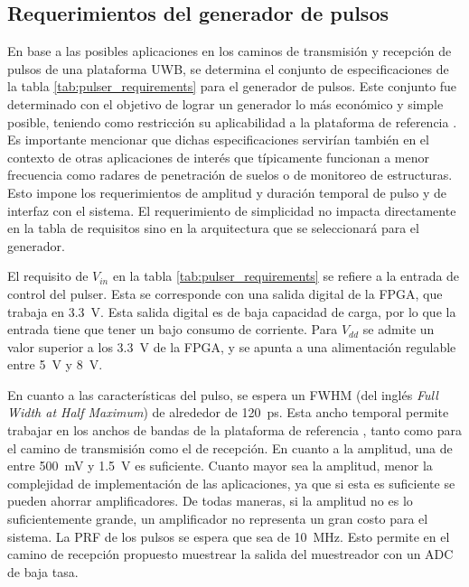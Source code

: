 \subsection{Requerimientos del generador de pulsos}

En base a las posibles aplicaciones en los caminos de transmisión y recepción de
pulsos de una plataforma UWB, se determina el conjunto de especificaciones de la
tabla \ref{tab:pulser_requirements} para el generador de pulsos. Este conjunto
fue determinado con el objetivo de lograr un generador lo más económico y simple
posible, teniendo como restricción su aplicabilidad a la plataforma de
referencia \cite{Altieri2021}. Es importante mencionar que dichas
especificaciones servirían también en el contexto de otras aplicaciones de
interés que típicamente funcionan a menor frecuencia como radares de penetración
de suelos o de monitoreo de estructuras. Esto impone los requerimientos de
amplitud y duración temporal de pulso y de interfaz con el sistema. El
requerimiento de simplicidad no impacta directamente en la tabla de requisitos
sino en la arquitectura que se seleccionará para el generador.

El requisito de $V_{in}$ en la tabla \ref{tab:pulser_requirements} se refiere a
la entrada de control del pulser. Esta se corresponde con una salida digital de
la FPGA, que trabaja en \qty{3.3}{\volt}.  Esta salida digital es de baja
capacidad de carga, por lo que la entrada tiene que tener un bajo consumo de
corriente. Para $V_{dd}$ se admite un valor superior a los \qty{3.3}{\volt} de
la FPGA, y se apunta a una alimentación regulable entre \qty{5}{\volt} y
\qty{8}{\volt}.

En cuanto a las características del pulso, se espera un FWHM (del inglés
\textit{Full Width at Half Maximum}) de alrededor de \qty{120}{\pico\second}.
Esta ancho temporal permite trabajar en los anchos de bandas de la plataforma de
referencia \cite{Altieri2021}, tanto como para el camino de transmisión como el
de recepción. En cuanto a la amplitud, una de entre \qty{500}{\milli\volt} y
\qty{1.5}{\volt} es suficiente. Cuanto mayor sea la amplitud, menor la
complejidad de implementación de las aplicaciones, ya que si esta es suficiente
se pueden ahorrar amplificadores. De todas maneras, si la amplitud no es lo
suficientemente grande, un amplificador no representa un gran costo para el
sistema. La PRF de los pulsos se espera que sea de \qty{10}{\mega\hertz}. Esto
permite en el camino de recepción propuesto muestrear la salida del muestreador
con un ADC de baja tasa.

